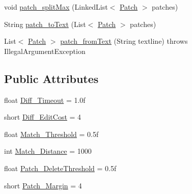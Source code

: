 \begin{DoxyCompactItemize}
\item 
void \hyperlink{classname_1_1fraser_1_1neil_1_1plaintext_1_1diff__match__patch_ad1f04d0671cdcb5e739333c1d2df519c}{patch\+\_\+split\+Max} (Linked\+List$<$ \hyperlink{classname_1_1fraser_1_1neil_1_1plaintext_1_1diff__match__patch_1_1Patch}{Patch} $>$ patches)
\item 
String \hyperlink{classname_1_1fraser_1_1neil_1_1plaintext_1_1diff__match__patch_a167785d3c8b918754a5d4eaf19e3773f}{patch\+\_\+to\+Text} (List$<$ \hyperlink{classname_1_1fraser_1_1neil_1_1plaintext_1_1diff__match__patch_1_1Patch}{Patch} $>$ patches)
\item 
List$<$ \hyperlink{classname_1_1fraser_1_1neil_1_1plaintext_1_1diff__match__patch_1_1Patch}{Patch} $>$ \hyperlink{classname_1_1fraser_1_1neil_1_1plaintext_1_1diff__match__patch_ac296da76e7e74e912727112ba7ff84ae}{patch\+\_\+from\+Text} (String textline)  throws Illegal\+Argument\+Exception 
\end{DoxyCompactItemize}
\subsection*{Public Attributes}
\begin{DoxyCompactItemize}
\item 
float \hyperlink{classname_1_1fraser_1_1neil_1_1plaintext_1_1diff__match__patch_a4edf86105dad04b3c09b83db303d64f8}{Diff\+\_\+\+Timeout} = 1.\+0f
\item 
short \hyperlink{classname_1_1fraser_1_1neil_1_1plaintext_1_1diff__match__patch_a28a239224c0ca2c3e8649d6656b14109}{Diff\+\_\+\+Edit\+Cost} = 4
\item 
float \hyperlink{classname_1_1fraser_1_1neil_1_1plaintext_1_1diff__match__patch_a5b4efe86c66f396067212d1bb876ef3a}{Match\+\_\+\+Threshold} = 0.\+5f
\item 
int \hyperlink{classname_1_1fraser_1_1neil_1_1plaintext_1_1diff__match__patch_a76beef22e81c595d8c6cd92c7daaa115}{Match\+\_\+\+Distance} = 1000
\item 
float \hyperlink{classname_1_1fraser_1_1neil_1_1plaintext_1_1diff__match__patch_ab48a2853a1d72f4217c4ebd388645a69}{Patch\+\_\+\+Delete\+Threshold} = 0.\+5f
\item 
short \hyperlink{classname_1_1fraser_1_1neil_1_1plaintext_1_1diff__match__patch_a5cba475f64055824f3242cde0605de1a}{Patch\+\_\+\+Margin} = 4
\end{DoxyCompactItemize}
